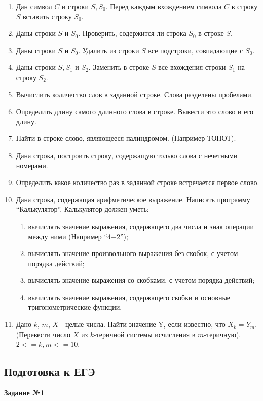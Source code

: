 \begin{enumerate}
  \item Дан символ $C$ и строки $S, S_0$. Перед каждым вхождением символа $C$ в строку $S$ вставить строку $S_0$.
  \item Даны строки $S$ и $S_0$. Проверить, содержится ли строка $S_0$ в строке $S$.
  \item Даны строки $S$ и $S_0$. Удалить из строки $S$ все подстроки, совпадающие с $S_0$.
  \item Даны строки $S, S_1$ и $S_2$. Заменить в строке $S$ все вхождения строки $S_1$ на строку $S_2$.
  \item Вычислить количество слов в заданной строке. Слова разделены пробелами.
  \item Определить длину самого длинного слова в строке. Вывести это слово и его длину.
  \item Найти в строке слово, являющееся палиндромом. (Например ТОПОТ).
  \item Дана строка, построить строку, содержащую только слова с нечетными номерами.
  \item Определить какое количество раз в заданной строке встречается первое слово.
  \item Дана строка, содержащая арифметическое выражение. Написать программу “Калькулятор”. Калькулятор должен уметь:
     \begin{enumerate}
       \item вычислять значение выражения, содержащего два числа и знак операции между ними (Например “4+2”);
       \item вычислять значение произвольного выражения без скобок, с учетом порядка действий;
       \item вычислять значение выражения со скобками, с учетом порядка действий;
       \item вычислять значение выражения, содержащего скобки и основные тригонометрические функции.
     \end{enumerate}
  \item Дано $k$, $m$, $X$ - целые числа. Найти значение Y, если известно, что $X_k=Y_m$. (Перевести число $X$  из $k$-теричной системы исчисления в $m$-теричную). $2<=k,m<=10$.
\end{enumerate}


\subsection{Подготовка к ЕГЭ}

{\bf Задание №1}

